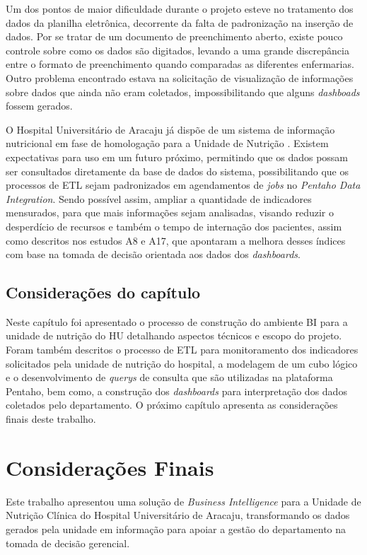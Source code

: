 Um dos pontos de maior dificuldade durante o projeto esteve no tratamento dos dados da planilha eletrônica, decorrente da falta de padronização na inserção de dados. Por se tratar de um documento de preenchimento aberto, existe pouco controle sobre como os dados são digitados, levando a uma grande discrepância entre o formato de preenchimento quando comparadas as diferentes enfermarias. Outro problema encontrado estava na solicitação de visualização de informações sobre dados que ainda não eram coletados, impossibilitando que alguns \textit{dashboads} fossem gerados.

O Hospital Universitário de Aracaju já dispõe de um sistema de informação nutricional em fase de homologação para a Unidade de Nutrição \cite{crisnaldo2020}. Existem expectativas para uso em um futuro próximo, permitindo que os dados possam ser consultados diretamente da base de dados do sistema, possibilitando que os processos de ETL sejam padronizados em agendamentos de \textit{jobs} no \textit{Pentaho Data Integration}. Sendo possível assim, ampliar a quantidade de indicadores mensurados, para que mais informações sejam analisadas, visando reduzir o desperdício de recursos e também o tempo de internação dos pacientes, assim como descritos nos estudos A8 e A17, que apontaram a melhora desses índices com base na tomada de decisão orientada aos dados dos \textit{dashboards}.

\section{Considerações do capítulo}
Neste capítulo foi apresentado o processo de construção do ambiente BI para a unidade de nutrição do HU detalhando aspectos técnicos e escopo do projeto. Foram também descritos o processo de ETL para monitoramento dos indicadores solicitados pela unidade de nutrição do hospital, a modelagem de um cubo lógico e o desenvolvimento de \textit{querys} de consulta que são utilizadas na plataforma Pentaho, bem como, a construção dos \textit{dashboards} para interpretação dos dados coletados pelo departamento. O próximo capítulo apresenta as considerações finais deste trabalho.


\chapter{Considerações Finais}
Este trabalho apresentou uma solução de \textit{Business Intelligence} para a Unidade de Nutrição Clínica do Hospital Universitário de Aracaju, transformando os dados gerados pela unidade em informação para apoiar a gestão do departamento na tomada de decisão gerencial.

